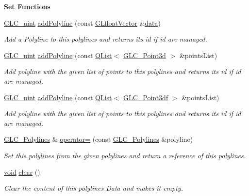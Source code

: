 \begin{Indent}{\bf Set Functions}\par
\begin{DoxyCompactItemize}
\item 
\hyperlink{glc__global_8h_abf950976fabed69026558df8e2da6c6b}{G\-L\-C\-\_\-uint} \hyperlink{class_g_l_c___polylines_a1c6b00c669f257dafc5d8592dba9b53e}{add\-Polyline} (const \hyperlink{glc__global_8h_a9f3f0b00cd127b066c9931b9c257a046}{G\-Lfloat\-Vector} \&\hyperlink{glext_8h_a8850df0785e6fbcc2351af3b686b8c7a}{data})
\begin{DoxyCompactList}\small\item\em Add a Polyline to this polylines and returns its id if id are managed. \end{DoxyCompactList}\item 
\hyperlink{glc__global_8h_abf950976fabed69026558df8e2da6c6b}{G\-L\-C\-\_\-uint} \hyperlink{class_g_l_c___polylines_a6979815538b933af322dc307967710a0}{add\-Polyline} (const \hyperlink{class_q_list}{Q\-List}$<$ \hyperlink{glc__vector3d_8h_a4e13a9bbc7ab3d34de7e98b41836772c}{G\-L\-C\-\_\-\-Point3d} $>$ \&points\-List)
\begin{DoxyCompactList}\small\item\em Add polyline with the given list of points to this polylines and returns its id if id are managed. \end{DoxyCompactList}\item 
\hyperlink{glc__global_8h_abf950976fabed69026558df8e2da6c6b}{G\-L\-C\-\_\-uint} \hyperlink{class_g_l_c___polylines_af61870dbd968e9542b36a558fede4f46}{add\-Polyline} (const \hyperlink{class_q_list}{Q\-List}$<$ \hyperlink{glc__vector3df_8h_a433841665e7ab0e1f29a0c68ce0d1cc7}{G\-L\-C\-\_\-\-Point3df} $>$ \&points\-List)
\begin{DoxyCompactList}\small\item\em Add polyline with the given list of points to this polylines and returns its id if id are managed. \end{DoxyCompactList}\item 
\hyperlink{class_g_l_c___polylines}{G\-L\-C\-\_\-\-Polylines} \& \hyperlink{class_g_l_c___polylines_a0da88739d360e9364d858433162d2691}{operator=} (const \hyperlink{class_g_l_c___polylines}{G\-L\-C\-\_\-\-Polylines} \&polyline)
\begin{DoxyCompactList}\small\item\em Set this polylines from the given polylines and return a reference of this polylines. \end{DoxyCompactList}\item 
\hyperlink{group___u_a_v_objects_plugin_ga444cf2ff3f0ecbe028adce838d373f5c}{void} \hyperlink{class_g_l_c___polylines_a5a6d8344b814c9855ed5bbb7b8775b47}{clear} ()
\begin{DoxyCompactList}\small\item\em Clear the content of this polylines Data and makes it empty. \end{DoxyCompactList}\end{DoxyCompactItemize}
\end{Indent}
